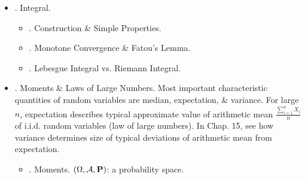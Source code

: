 \documentclass{article}
\newtheorem{problem}{Problem}
\newtheorem{theorem}{Theorem}
\begin{document}
\begin{enumerate}
\begin{itemize}
\begin{itemize}
			\begin{problem}
				Come up with an example for $X$ s.t. series in (3.1) does not converge for any $z > 1$ but $\lim_{x\uparrow1} \psi_X'(x)$ exists \& is finite.
			\end{problem}
			
			\begin{theorem}[Multiplicativity of generating functions]
				If $X_1,\ldots,X_n$ are independent \& $\mathbb{N}_0$-valued random variables, then $\psi_{X_1 + \cdots + X_n} = \prod_{i=1}^n \psi_{X_i}$.
			\end{theorem}
			\item {. Poisson Approximation.}
			\item {. Branching Processes.}
		\end{itemize}
		\item {. Integral.}
		\begin{itemize}
			\item {. Construction \& Simple Properties.}
			\item {. Monotone Convergence \& Fatou's Lemma.}
			\item {. Lebesgue Integral vs. Riemann Integral.}
		\end{itemize}
		\item {. Moments \& Laws of Large Numbers.} Most important characteristic quantities of random variables are median, expectation, \& variance. For large $n$, expectation describes typical approximate value of arithmetic mean $\frac{\sum_{i=1}^n X_i}{n}$ of i.i.d. random variables (law of large numbers). In Chap. 15, see how variance determines size of typical deviations of arithmetic mean from expectation.
		\begin{itemize}
			\item {. Moments.} $(\Omega,\mathcal{A},{\bf P})$: a probability space.
			

\end{itemize}
\end{itemize}
\end{enumerate}
\end{document}

